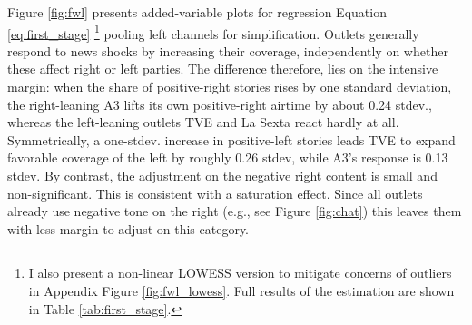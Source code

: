 \documentclass[12pt]{article}
\begin{document}
Figure \ref{fig:fwl} presents added-variable plots for regression Equation  \eqref{eq:first_stage} \footnote{I also present a non-linear LOWESS version to mitigate concerns of outliers in Appendix Figure \ref{fig:fwl_lowess}. Full results of the estimation are shown in Table \ref{tab:first_stage}.} pooling left channels for simplification. Outlets generally respond to news shocks by increasing their coverage, independently on whether these affect  right or left parties. The difference therefore, lies on the intensive margin: when the share of  positive-right stories rises by one standard deviation, the right-leaning A3 lifts its own positive-right airtime by about 0.24 stdev., whereas the left-leaning outlets TVE and La Sexta react hardly at all.  Symmetrically, a one-stdev. increase in positive-left stories leads TVE to expand favorable coverage of the left by roughly 0.26 stdev, while A3’s response is 0.13 stdev.  By contrast, the adjustment on the negative right content is small and non-significant. This is consistent with a saturation effect. Since all outlets already use negative tone on the right  (e.g., see Figure \ref{fig:chat}) this leaves them with less margin to adjust on this category. 





\end{document}
